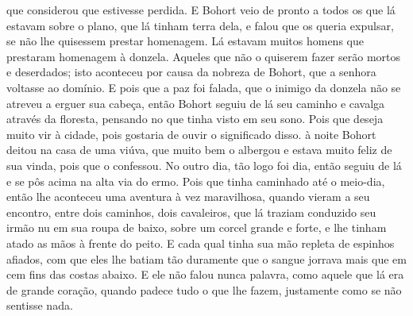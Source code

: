 que considerou que estivesse perdida. E Bohort veio de pronto a todos os que lá
estavam sobre o plano, que lá tinham terra dela, e falou que os queria
expulsar, se não lhe quisessem prestar homenagem.  Lá estavam muitos
homens que prestaram homenagem à donzela. Aqueles que não o quiserem fazer
serão mortos e deserdados; isto aconteceu por causa da nobreza de Bohort, que a
senhora voltasse ao domínio. E pois que a paz foi falada, que o inimigo da
donzela não se atreveu a erguer sua cabeça, então Bohort seguiu de lá seu
caminho e cavalga através da floresta, pensando no que tinha visto em seu sono.
Pois que deseja muito vir à cidade, pois gostaria de ouvir o significado disso.
à noite Bohort deitou na casa de uma viúva, que muito bem o albergou e estava
muito feliz de sua vinda, pois que o confessou. No outro dia, tão logo foi dia,
então seguiu de lá e se pôs acima na alta via do ermo. Pois que tinha caminhado
até o meio-dia, então lhe aconteceu uma aventura à vez maravilhosa, quando
vieram a seu encontro, entre dois caminhos, dois cavaleiros, que lá traziam
conduzido seu irmão nu em sua roupa de baixo, sobre um corcel grande e forte, e
lhe tinham atado as mãos à frente do peito. E cada qual tinha sua mão repleta
de espinhos afiados, com que eles lhe batiam tão duramente que o sangue jorrava
mais que em cem fins das costas abaixo. E ele não falou nunca palavra, como
aquele que lá era de grande coração, quando padece tudo o que lhe fazem,
justamente como se não sentisse nada.

